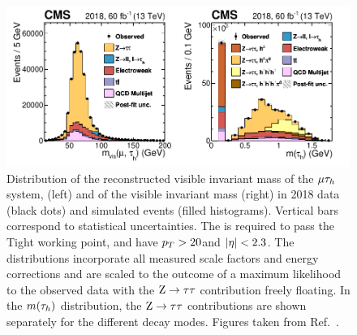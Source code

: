 \begin{figure}
  \centering
  \includegraphics[width=\textwidth]{Figures/Detector/CMS/tau_energy_scale_fits.pdf}
  \caption[\tauh Energy Scale Agreement Between Simulation and Data]{Distribution of the reconstructed visible invariant mass of the $\mu\tau_h$ system, \mvis (left) and of the visible invariant \tauh mass (right) in 2018 data (black dots) and simulated events (filled histograms). Vertical bars correspond to statistical uncertainties. The \tauh is required to pass the Tight \Djet working point, and have $p_T > 20$\GeV and $\lvert \eta \rvert<2.3$. The distributions incorporate all measured scale factors and energy corrections and are scaled to the outcome of a maximum likelihood to the observed data with the $\mathrm{Z}\to\tau\tau$ contribution freely floating. In the $m(\tau_h)$ distribution, the $\mathrm{Z}\to\tau\tau$ contributions are shown separately for the different \tauh decay modes. Figures taken from Ref.~\cite{CMS:2022prd}.}\label{fig:tau_energy_scale_fit}
\end{figure}

